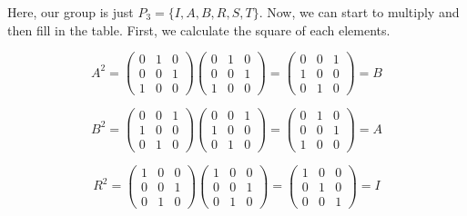 \documentclass[12pt]{article}
\begin{document}
Here, our group is just $P_3=\{I,A,B,R,S,T\}$.  Now, we can start to multiply and then fill in the table.
First, we calculate the square of each elements.

\begin{displaymath}
A^2=\left( \begin{array}{ccc}
0 & 1 & 0 \\
0 & 0 & 1 \\
1 & 0 & 0
\end{array} \right )
\left( \begin{array}{ccc}
0 & 1 & 0 \\
0 & 0 & 1 \\
1 & 0 & 0
\end{array} \right )=
\left( \begin{array}{ccc}
0 & 0 & 1 \\
1 & 0 & 0 \\
0 & 1 & 0
\end{array} \right )=B
\end{displaymath}

\begin{displaymath}
B^2=\left( \begin{array}{ccc}
0 & 0 & 1 \\
1 & 0 & 0 \\
0 & 1 & 0
\end{array} \right )
\left( \begin{array}{ccc}
0 & 0 & 1 \\
1 & 0 & 0\\
0 & 1 & 0
\end{array} \right )=
\left( \begin{array}{ccc}
0 & 1 & 0 \\
0 & 0 & 1 \\
1 & 0 & 0
\end{array} \right )=A
\end{displaymath}

\begin{displaymath}
R^2=\left( \begin{array}{ccc}
1 & 0 & 0 \\
0 & 0 & 1\\
0 & 1 & 0
\end{array} \right )
\left( \begin{array}{ccc}
1 & 0 & 0 \\
0 & 0 & 1\\
0 & 1 & 0
\end{array} \right )=
\left( \begin{array}{ccc}
1 & 0 & 0 \\
0 & 1 & 0\\
0 & 0 & 1
\end{array} \right )=I
\end{displaymath}
\end{document}
